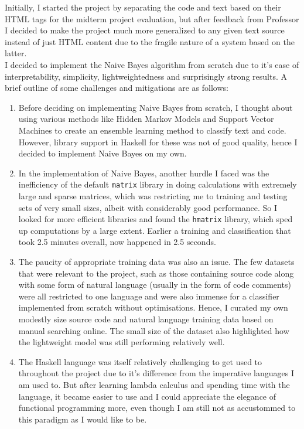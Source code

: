 \documentclass[12pt]{scrreprt}
\newcommand{\ttt}[1]{\texttt{#1}}
\begin{document}
Initially, I started the project by separating the code and text based on their HTML tags for the midterm project evaluation, but after feedback from Professor I decided to make the project much more generalized to any given text source instead of just HTML content due to the fragile nature of a system based on the latter. \\ I decided to implement the Naive Bayes algorithm from scratch due to it's ease of interpretability, simplicity, lightweightedness and surprisingly strong results. A brief outline of some challenges and mitigations are as follows:
\begin{enumerate}
    \item Before deciding on implementing Naive Bayes from scratch, I thought about using various methods like Hidden Markov Models and Support Vector Machines to create an ensemble learning method to classify text and code. However, library support in Haskell for these was not of good quality, hence I decided to implement Naive Bayes on my own.
    \item In the implementation of Naive Bayes, another hurdle I faced was the inefficiency of the default \ttt{matrix} library in doing calculations with extremely large and sparse matrices, which was restricting me to training and testing sets of very small sizes, albeit with considerably good performance. So I looked for more efficient libraries and found the \ttt{hmatrix} library, which sped up computations by a large extent. Earlier a training and classification that took 2.5 minutes overall, now happened in 2.5 seconds. 
    \item The paucity of appropriate training data was also an issue. The few datasets that were relevant to the project, such as those containing source code along with some form of natural language (usually in the form of code comments) were all restricted to one language and were also immense for a classifier implemented from scratch without optimisations. Hence, I curated my own modestly size source code and natural language training data based on manual searching online. The small size of the dataset also highlighted how the lightweight model was still performing relatively well. 
    \item The Haskell language was itself relatively challenging to get used to throughout the project due to it's difference from the imperative languages I am used to. But after learning lambda calculus and spending time with the language, it became easier to use and I could appreciate the elegance of functional programming more, even though I am still not as accustommed to this paradigm as I would like to be. 
\end{enumerate}
\end{document}
